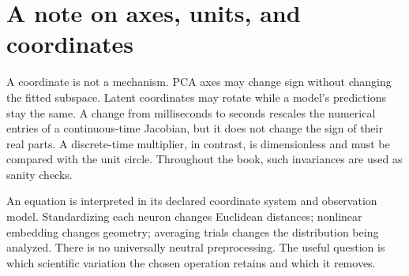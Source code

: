 \section*{A note on axes, units, and coordinates}
A coordinate is not a mechanism. PCA axes may change sign without changing the fitted subspace. Latent coordinates may rotate while a model's predictions stay the same. A change from milliseconds to seconds rescales the numerical entries of a continuous-time Jacobian, but it does not change the sign of their real parts. A discrete-time multiplier, in contrast, is dimensionless and must be compared with the unit circle. Throughout the book, such invariances are used as sanity checks.

An equation is interpreted in its declared coordinate system and observation model. Standardizing each neuron changes Euclidean distances; nonlinear embedding changes geometry; averaging trials changes the distribution being analyzed. There is no universally neutral preprocessing. The useful question is which scientific variation the chosen operation retains and which it removes.
